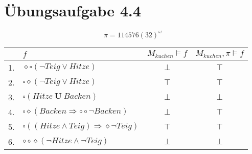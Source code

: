 \documentclass[a4paper]{scrartcl}
\begin{document}
\section*{Übungsaufgabe 4.4}
\begin{equation*}
    \pi = 114576(32)^\omega
\end{equation*}

\begin{table}[h]
    \centering
    \begin{tabular}{r|l|c|c}
           & $f$ & $M_{kuchen} \models  f$ & $M_{kuchen}, \pi \models  f$ \\ \hline
        1. & $\diamond\square(\lnot Teig \lor Hitze)$                     & $\bot$ & $\top$ \\
        2. & $\square\diamond(\lnot Teig \lor Hitze)$                     & $\top$ & $\top$ \\
        3. & $\square(Hitze ~\textbf{U}~ Backen)$                         & $\bot$ & $\bot$ \\
        4. & $\square\diamond(Backen \Rightarrow \circ\circ\lnot Backen)$ & $\bot$ & $\top$ \\
        5. & $\square((Hitze \land Teig) \Rightarrow \diamond\lnot Teig)$ & $\top$ & $\top$ \\
        6. & $\circ\circ\diamond(\lnot Hitze \land \lnot Teig)$           & $\bot$ & $\bot$ \\
    \end{tabular}
\end{table}
\end{document}

